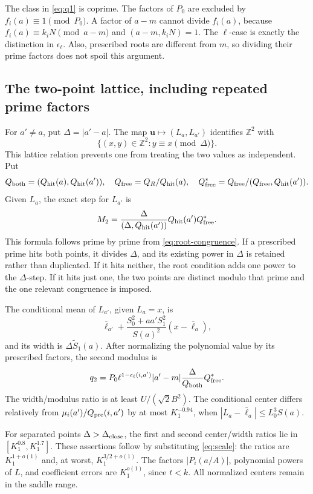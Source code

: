 The class in \eqref{eq:q1} is coprime.  The factors of \(P_0\) are
excluded by \(f_i(a)\equiv1\pmod{P_0}\).  A factor of \(a-m\)
cannot divide \(f_i(a)\), because
\(f_i(a)\equiv k_iN\pmod{a-m}\) and
\((a-m,k_iN)=1\).  The \(\ell\)-case is exactly the distinction in
\(\epsilon_\ell\).  Also, prescribed roots are different from
\(m\), so dividing their prime factors does not spoil this argument.

\subsection{The two-point lattice, including repeated prime factors}

For \(a'\ne a\), put \(\Delta=|a'-a|\).  The map
\(\mathbf u\mapsto(L_a,L_{a'})\) identifies \(\mathbb Z^2\) with
\[
 \{(x,y)\in\mathbb Z^2:y\equiv x\pmod\Delta\}.
\]
This lattice relation prevents one from treating the two values as
independent.  Put
\[
 Q_{\rm both}=(Q_{\rm hit}(a),Q_{\rm hit}(a')),
 \quad Q_{\rm free}=Q_R/Q_{\rm hit}(a),
 \quad Q_{\rm free}^*=Q_{\rm free}/(Q_{\rm free},Q_{\rm hit}(a')).
\]
Given \(L_a\), the exact step for \(L_{a'}\) is
\begin{equation}\label{eq:M2}
 M_2=\frac{\Delta}{(\Delta,Q_{\rm hit}(a'))}
          Q_{\rm hit}(a')Q_{\rm free}^*.
\end{equation}
This formula follows prime by prime from \eqref{eq:root-congruence}.
If a prescribed prime hits both points, it divides \(\Delta\), and
its existing power in \(\Delta\) is retained rather than duplicated.
If it hits neither, the root condition adds one power to the
\(\Delta\)-step.  If it hits just one, the two points are distinct
modulo that prime and the one relevant congruence is imposed.

The conditional mean of \(L_{a'}\), given \(L_a=x\), is
\[
 \bar\ell_{a'}+\frac{S_0^2+aa'S_1^2}{S(a)^2}(x-\bar\ell_a),
\]
and its width is \(\Delta\widetilde S_1(a)\).
After normalizing the polynomial value by its prescribed factors,
the second modulus is
\begin{equation}\label{eq:q2}
 q_2=P_0\ell^{1-\epsilon_\ell(i,a')}|a'-m|
             \frac{\Delta}{Q_{\rm both}}Q_{\rm free}^*.
\end{equation}
The width/modulus ratio is at least \(U/(\sqrt2B^2)\).
The conditional center differs relatively from
\(\mu_i(a')/Q_{\rm pre}(i,a')\) by at most \(K_1^{-0.94}\),
when \(|L_a-\bar\ell_a|\le L_0^3S(a)\).

For separated points \(\Delta>\Delta_{\rm close}\), the first and
second center/width ratios lie in
\([K_1^{0.8},K_1^{1.7}]\).  These assertions follow by substituting
\eqref{eq:scale}: the ratios are \(K_1^{1+o(1)}\) and, at worst,
\(K_1^{3/2+o(1)}\).  The factors \(|P_i(a/A)|\), polynomial powers
of \(L\), and coefficient errors are \(K_1^{o(1)}\), since \(t<k\).
All normalized centers remain in the saddle range.

